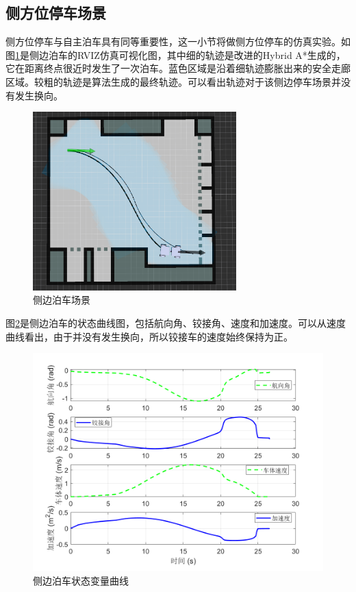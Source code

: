 \documentclass[master,academic]{ysuthesis} %
\begin{document}
		\subsection{侧方位停车场景}
		侧方位停车与自主泊车具有同等重要性，这一小节将做侧方位停车的仿真实验。如图\ref{fig:cebianboche}是侧边泊车的RVIZ仿真可视化图，其中细的轨迹是改进的Hybrid A*生成的，它在距离终点很近时发生了一次泊车。蓝色区域是沿着细轨迹膨胀出来的安全走廊区域。较粗的轨迹是算法生成的最终轨迹。可以看出轨迹对于该侧边停车场景并没有发生换向。
		\begin{figure}[!ht]
			\centering
			\includegraphics[width=0.7\textwidth]{cebianboche.png}
			\caption{侧边泊车场景}
			\label{fig:cebianboche}
		\end{figure}

		图\ref{fig:datacebianstate}是侧边泊车的状态曲线图，包括航向角、铰接角、速度和加速度。可以从速度曲线看出，由于并没有发生换向，所以铰接车的速度始终保持为正。
		\begin{figure}[!ht]
			\centering
			\includegraphics[width=1\textwidth]{datacebianstate.png}
			\caption{侧边泊车状态变量曲线}
			\label{fig:datacebianstate}
		\end{figure}
\end{document}
